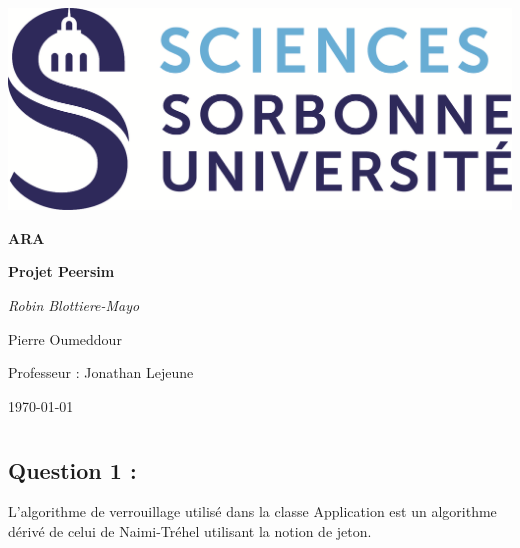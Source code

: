 \documentclass[11pt,a4paper]{report}
\begin{document}
\begin{titlepage}

\centering
\includegraphics[scale=0.4]{SU.png}\par\vspace{1cm}
\vspace{1cm}
{\scshape\bfseries ARA\par}
\vspace{1.5cm}
{\huge\bfseries Projet Peersim\par}
\vspace{2cm}
{\Large\itshape Robin Blottiere-Mayo\par
	Pierre Oumeddour\par}
\vfill
{\Large Professeur : Jonathan Lejeune}
\vfill

{\large \today\par}
\end{titlepage}




\chapter{}

\section{Question 1 :}

L'algorithme de verrouillage utilisé dans la classe Application est un algorithme dérivé de celui de Naimi-Tréhel utilisant la notion de jeton.
\end{document}
